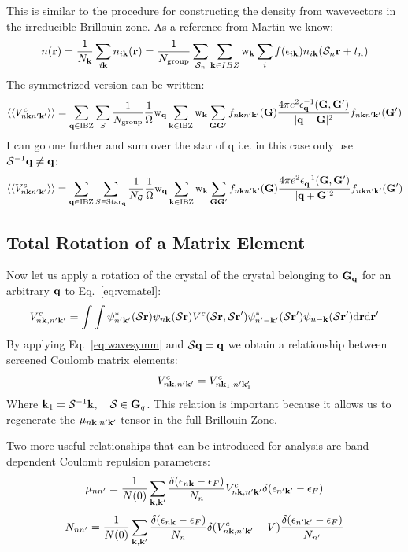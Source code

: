 This is similar to the procedure for constructing 
the density from wavevectors in the irreducible 
Brillouin zone. As a reference from Martin we know:
%
\begin{equation}
\label{eq:symmdens}
n({\bf r}) = \frac{1}{N_{{\bf k}}}\sum_{i{\bf k}}n_{i{\bf k}}({\bf r}) = \frac{1}{N_{\rm group}}\sum_{\mathcal{S}_{n}}\sum_{{\bf k}\in IBZ}{\rm w}_{{\bf k}}\sum_{i}f(\epsilon_{i{\bf k}})n_{i{\bf k}}(\mathcal{S}_{n}{\bf r} + t_{n})
\end{equation}
%
The symmetrized version can be written:
%
\begin{equation}
\langle\langle V^{c}_{n{\bf k} n'{\bf k}'}\rangle\rangle=\sum_{{\bf q}\in{\rm IBZ}}\sum_{S}\frac{1}{N_{\rm group}}\frac{1}{\Omega}{\rm w}_{{\bf q}}\sum_{{\bf k}\in {\rm IBZ}}{\rm w}_{{\bf k}}\sum_{{\bf G} {\bf G}'} f_{n{\bf k} n'{\bf k}'}({\bf G})\frac{4\pi e^{2}\epsilon_{{\bf q}}^{-1}({\bf G},{\bf G}')}{|{\bf q}+{\bf G}|^{2}}f_{n{\bf k} n'{\bf k}'}({\bf G}')
\end{equation}
%
I can go one further and sum over the star of q i.e. in this case only use $\mathcal{S}^{-1}{\bf q} \neq {\bf q}$:
%
\begin{equation}
\langle \langle V^{c}_{n{\bf k} n'{\bf k}'} \rangle \rangle = \sum_{{\bf q}\in{\rm IBZ}}\sum_{S\in{\rm Star_{{\bf q}}}}\frac{1}{N_{\mathcal{G}}}\frac{1}{\Omega}{\rm w}_{{\bf q}}\sum_{{\bf k}\in {\rm IBZ}}{\rm w}_{{\bf k}}\sum_{{\bf G} {\bf G}'}f_{n{\bf k} n'{\bf k}'}({\bf G})\frac{4\pi e^{2}\epsilon_{{\bf q}}^{-1}({\bf G},{\bf G}')}{|{\bf q}+{\bf G}|^{2}}f_{n{\bf k} n'{\bf k}'}({\bf G}')
\end{equation}
%

\subsection{Total Rotation of a Matrix Element}
Now let us apply a rotation of the crystal of the crystal belonging to ${\bf G}_{{\bf q}}$ for
an arbitrary ${\bf q}$ to Eq.~\ref{eq:vcmatel}:
%
\begin{equation}
V^{c}_{n{\bf k},n'{\bf k}'} = \int \int \psi^{*}_{n'{\bf k}'}(\mathcal{S}{\bf r})\psi_{n{\bf k}}(\mathcal{S}{\bf r})V^{c}(\mathcal{S}{\bf r},\mathcal{S}{\bf r}')\psi^{*}_{n'-{\bf k}'}(\mathcal{S}{\bf r}')\psi_{n-{\bf k}}(\mathcal{S}{\bf r}')\rm{d}{\bf r} \rm{d}{\bf r}'
\end{equation}
%
By applying Eq.~\ref{eq:wavesymm} and $\mathcal{S}{\bf q}={\bf q}$ we obtain a relationship between 
screened Coulomb matrix elements:
%
\begin{equation}
\label{eq:equivmatel}
V^{c}_{n{\bf k},n'{\bf k}'} = V^{c}_{n{\bf k}_{1},n'{\bf k}'_{1}}
\end{equation}
%
Where ${\bf k}_{1}=\mathcal{S}^{-1}{\bf k},\quad \mathcal{S}\in{\bf G}_{q}$. This relation is important because it allows us to regenerate
the $\mu_{n{\bf k},n'{\bf k}'}$ tensor in the full Brillouin Zone.

Two more useful relationships that can be introduced for analysis are band-dependent 
Coulomb repulsion parameters:
%
\begin{equation}
\mu_{nn'} = \frac{1}{N(0)} \sum_{{\bf k},{\bf k}'} \frac{\delta(\epsilon_{n{\bf k}}-\epsilon_{F})}{N_{n}}V^{c}_{n{\bf k},n'{\bf k}'}\delta(\epsilon_{n'{\bf k}'}-\epsilon_{F})
\end{equation}
%
\begin{equation}
N_{nn'} = \frac{1}{N(0)} \sum_{{\bf k},{\bf k}'}\frac{\delta(\epsilon_{n{\bf k}}-\epsilon_{F})}{N_{n}}
\delta(V^{c}_{n{\bf k},n'{\bf k}'}-V) \frac{\delta(\epsilon_{n'{\bf k}'}-\epsilon_{F})}{N_{n'}}
\end{equation}

